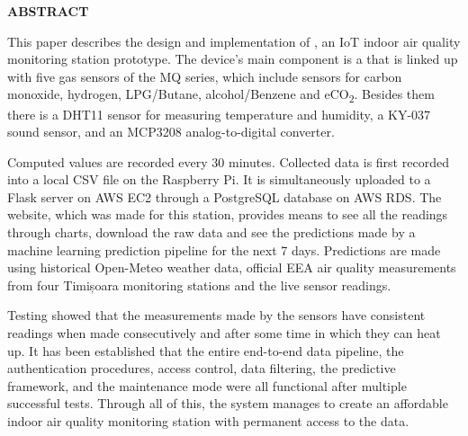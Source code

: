 \newpage
\thispagestyle{plain}

\vspace*{3\baselineskip}

\begin{center}
{\fontsize{20}{24}\selectfont\textbf{\MakeUppercase{Abstract}}}
\end{center}

\vspace{2\baselineskip}

This paper describes the design and implementation of \airnest{}, an IoT indoor air quality
monitoring station prototype. The device's main component is a \RPi{} that is linked up with five
gas sensors of the MQ series, which include sensors for carbon monoxide, hydrogen, LPG/Butane,
alcohol/Benzene and eCO\textsubscript{2}. Besides them there is a DHT11 sensor for measuring
temperature and humidity, a KY-037 sound sensor, and an MCP3208 analog-to-digital converter.

Computed values are recorded every 30 minutes. Collected data is first recorded into a local CSV
file on the Raspberry Pi. It is simultaneously uploaded to a Flask server on AWS EC2 through a
PostgreSQL database on AWS RDS. The website, which was made for this station, provides means to
see all the readings through charts, download the raw data and see the predictions made by a
machine learning prediction pipeline for the next 7 days. Predictions are made using historical
Open-Meteo weather data, official EEA air quality measurements from four Timișoara monitoring
stations and the live sensor readings.

Testing showed that the measurements made by the sensors have consistent readings when made
consecutively and after some time in which they can heat up. It has been established that the
entire end-to-end data pipeline, the authentication procedures, access control, data filtering,
the predictive framework, and the maintenance mode were all functional after multiple successful
tests. Through all of this, the system manages to create an affordable indoor air quality
monitoring station with permanent access to the data.

\newpage

